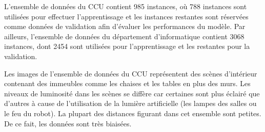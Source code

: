 L'ensemble de données du CCU contient 985 instances, où 788 instances sont
utilisées pour effectuer l'apprentissage et les instances restantes sont réservées
comme données de validation afin d'évaluer les performances du modèle.
Par ailleurs, l'ensemble de données du département d'informatique contient 3068
instances, dont 2454 sont utilisées pour l'apprentissage et les restantes pour
la validation.

Les images de l'ensemble de données du CCU représentent des scènes d'intérieur
contenant des immeubles comme les chaises et les tables en plus des murs.
Les niveaux de luminosité dans les scènes se diffère car certaines sont plus
éclairé que d'autres à cause de l'utilisation de la lumière artificielle (les
lampes des salles ou le feu du robot). La plupart des distances figurant dans
cet ensemble sont petites. De ce fait, les données sont très biaisées.

\bigskip

